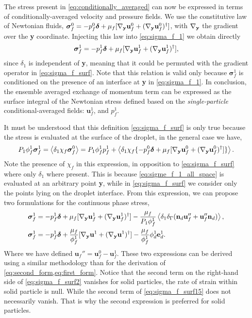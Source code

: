The stress present in \ref{eq:conditionally_averaged} can now be expressed in terms of conditionally-averaged velocity and pressure fields. 
We use the constitutive law of Newtonian fluids, $\bm\sigma_f^0 = -p_f^0 \bm\delta + \mu_f [{\mathbf{\nabla}_\textbf{y}} \textbf{u}_f^0+ ({\mathbf{\nabla}_\textbf{y}} \textbf{u}_f^0)^\dagger]$, with ${\mathbf{\nabla}_\textbf{y}}$ the gradient over the \textbf{y} coordinate.
Injecting this law into \ref{eq:sigma_f_1} we obtain directly 
\begin{equation}
    \bm\sigma_f^1
    = - p_f^1 \bm\delta
    +\mu_f [\pddy \textbf{u}_f^1+(\pddy \textbf{u}_f^1)^\dagger], 
    \label{eq:sigma_f_surf}
\end{equation}
since $\delta_1$ is independent of \textbf{y}, meaning that it could be permuted with the gradient operator in \ref{eq:sigma_f_surf}. 
Note that this relation is valid only because $\bm\sigma_f^1$ is conditioned on the presence of an interface at \textbf{y} in \ref{eq:sigma_f_1}. 
In conclusion, the ensemble averaged exchange of momentum term can be expressed as the surface integral of the Newtonian stress defined based on the \textit{single-particle} conditional-averaged fields: $\textbf{u}_f^1$, and $p_f^1$. 

It must be understood that this definition \eqref{eq:sigma_f_surf} is only true because the stress is evaluated at the surface of the droplet, in the general case we have, 
\begin{equation}
    P_1 \phi_f^1 \bm\sigma_f^1
    =
    \avg{\delta_1 \chi_f \bm\sigma_f^0}
    =
    P_1 \phi_f^1 p_f^1
    +  \avg{\delta_1\chi_f \{ - p_f^0 \bm\delta + \mu_f [\pddy \textbf{u}_f^0+  (\pddy \textbf{u}_f^0)^\dagger]\}}. 
    \label{eq:sigme_f_1_all_space}
\end{equation}
Note the presence of $\chi_f$ in this expression, in opposition to \ref{eq:sigma_f_surf} where only $\delta_1$ where present.
This is because \ref{eq:sigme_f_1_all_space} is evaluated at an arbitrary point \textbf{y}, while in \ref{eq:sigma_f_surf} we consider only the points lying on the droplet interface.  
From this expression, we can propose two formulations for the continuous phase stress,   
\begin{align}    
    \bm\sigma_f^1
    &= 
    - p_f^1 \bm\delta 
    + \mu_f [\pddy \textbf{u}_f^1+ (\pddy \textbf{u}_f^1)^\dagger ]
    - \frac{\mu_f }{P_1 \phi_f^1}\avg{\delta_1 \delta_\Gamma (\textbf{n}_d \textbf{u}_f''+  \textbf{u}_f'' \textbf{n}_d)},
    \label{eq:sigma_f_surf15}
    \\
    \bm\sigma_f^1
    &= 
    - p_f^1 \bm\delta 
    + \frac{\mu_f }{\phi_f^1} [\pddy \textbf{u}^1+ (\pddy \textbf{u}^1)^\dagger ]
    - \frac{\mu_f }{\phi_f^1} \phi_d^1 \textbf{e}_d^1. 
    \label{eq:sigma_f_surf2}
\end{align}
Where we have defined $\textbf{u}_f'' = \textbf{u}_f^0 - \textbf{u}_f^1$. 
These two expressions can be derived using a similar methodology than for the derivation of \ref{eq:second_form,eq:first_form}. 
Notice that the second term on the right-hand side of \ref{eq:sigma_f_surf2} vanishes for solid particles, the rate of strain within solid particle is null.
While the second term of \ref{eq:sigma_f_surf15} does not necessarily vanish. 
That is why the second expression is preferred for solid particles. 

